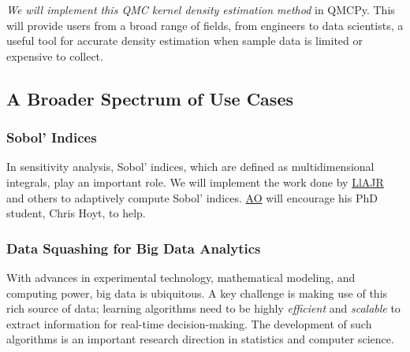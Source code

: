 \documentclass[11pt]{NSFamsart}
\newcommand{\AO}{\hyperlink{AOlink}{AO}\xspace}
\newcommand{\LlAJR}{\hyperlink{LlAJRlink}{LlAJR}\xspace}
\begin{document}
\textit{We will implement this QMC kernel density estimation method} in QMCPy. This will provide users from a broad range of fields, from engineers to data scientists, a useful tool for accurate density estimation when sample data is limited or expensive to collect.






\subsection{A Broader Spectrum of Use Cases}

\subsubsection{Sobol' Indices} In sensitivity analysis, Sobol' indices, which are defined as multidimensional integrals, play an important role.  We will implement the work done by \LlAJR and others \cite{GilEtal16a,GilJim16b} to adaptively compute Sobol' indices.  \AO will encourage his PhD student, Chris Hoyt, to help.

\subsubsection{Data Squashing for Big Data Analytics}

With advances in experimental technology, mathematical modeling, and computing power, big data is ubiquitous.  A key challenge is making use of this rich source of data; learning algorithms need to be highly \textit{efficient} and \textit{scalable} to extract information for real-time decision-making. The development of such algorithms is an important research direction in statistics and computer science.
\end{document}
